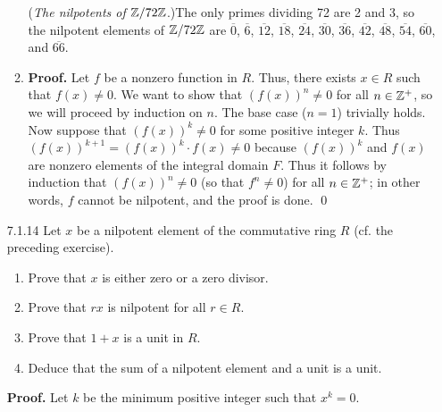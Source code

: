 \begin{enumerate}
\begin{enumerate}
               (\textit{The nilpotents of $\mathbb{Z}/72\mathbb{Z}$}.)The only primes dividing
               72 are 2 and 3, so the nilpotent elements of $\mathbb{Z}/72\mathbb{Z}$ are
               $\overline{0}$, $\overline{6}$, $\overline{12}$, $\overline{18}$, 
               $\overline{24}$, $\overline{30}$, $\overline{36}$,
               $\overline{42}$, $\overline{48}$, $\overline{54}$,
               $\overline{60}$, and $\overline{66}$.
         \item \textbf{Proof.} Let $f$ be a nonzero function in $R$. Thus, there
               exists $x \in R$ such that $f(x) \neq 0$. We want to show that
               $(f(x))^n \neq 0$ for all $n \in \mathbb{Z}^+$, so we will proceed by 
               induction on $n$. The base case ($n = 1$) trivially holds. Now 
               suppose that $(f(x))^k\neq 0$ for some positive integer $k$. Thus
               $(f(x))^{k+1} = (f(x))^k\cdot f(x) \neq 0$
               because $(f(x))^k$ and $f(x)$ are nonzero elements of the 
               integral domain $F$. Thus it follows by induction that
               $(f(x))^n \neq 0$ (so that $f^n \neq 0$) for all $n \in \mathbb{Z}^+$;
               in other words, $f$ cannot be nilpotent, and the proof is done. 
               \qed
      \end{enumerate}
   \item[7.1.14]  Let $x$ be a nilpotent element of the commutative ring $R$
                  (cf. the preceding exercise).
                  \begin{enumerate}
                     \item Prove that $x$ is either zero or a zero divisor.
                     \item Prove that $rx$ is nilpotent for all $r \in R$.
                     \item Prove that $1 + x$ is a unit in $R$.
                     \item Deduce that the sum of a nilpotent element and a unit
                           is a unit.
                  \end{enumerate}

      \textbf{Proof.} Let $k$ be the minimum positive integer such that
      $x^k = 0$.


\end{enumerate}

